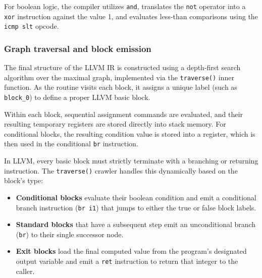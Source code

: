 \documentclass[12pt]{article}
\newcommand{\Code}[1]{\texttt{#1}}
\begin{document}
For boolean logic, the compiler utilizes \texttt{and}, translates the
\texttt{not} operator into a \texttt{xor} instruction against the value 1, and
evaluates less-than comparisons using the \texttt{icmp slt} opcode.

\subsubsection{Graph traversal and block emission}

The final structure of the LLVM IR is constructed using a depth-first search
algorithm over the maximal graph, implemented via the \Code{traverse()} inner
function. As the routine visits each block, it assigns a unique label (such as
\texttt{block\_0}) to define a proper LLVM basic block.

Within each block, sequential assignment commands are evaluated, and their
resulting temporary registers are stored directly into stack memory. For
conditional blocks, the resulting condition value is stored into a register,
which is then used in the conditional \texttt{br} instruction.

In LLVM, every basic block must strictly terminate with a branching or returning
instruction. The \texttt{traverse()} crawler handles this dynamically based on
the block's type:
\begin{itemize}
    \item \textbf{Conditional blocks} evaluate their boolean condition and emit
        a conditional branch instruction (\texttt{br i1}) that jumps to either
        the true or false block labels.
    \item \textbf{Standard blocks} that have a subsequent step emit an
        unconditional branch (\texttt{br}) to their single successor node.
    \item \textbf{Exit blocks} load the final computed value from the program's
        designated output variable and emit a \texttt{ret} instruction to return
        that integer to the caller.
\end{itemize}
\end{document}
